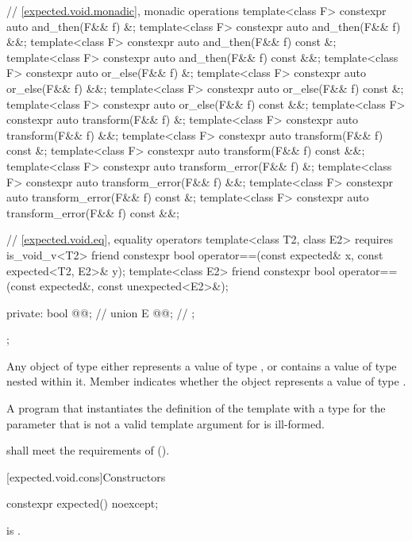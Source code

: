 \begin{codeblock}
{  // \ref{expected.void.monadic}, monadic operations
  template<class F> constexpr auto and_then(F&& f) &;
  template<class F> constexpr auto and_then(F&& f) &&;
  template<class F> constexpr auto and_then(F&& f) const &;
  template<class F> constexpr auto and_then(F&& f) const &&;
  template<class F> constexpr auto or_else(F&& f) &;
  template<class F> constexpr auto or_else(F&& f) &&;
  template<class F> constexpr auto or_else(F&& f) const &;
  template<class F> constexpr auto or_else(F&& f) const &&;
  template<class F> constexpr auto transform(F&& f) &;
  template<class F> constexpr auto transform(F&& f) &&;
  template<class F> constexpr auto transform(F&& f) const &;
  template<class F> constexpr auto transform(F&& f) const &&;
  template<class F> constexpr auto transform_error(F&& f) &;
  template<class F> constexpr auto transform_error(F&& f) &&;
  template<class F> constexpr auto transform_error(F&& f) const &;
  template<class F> constexpr auto transform_error(F&& f) const &&;

  // \ref{expected.void.eq}, equality operators
  template<class T2, class E2> requires is_void_v<T2>
    friend constexpr bool operator==(const expected& x, const expected<T2, E2>& y);
  template<class E2>
    friend constexpr bool operator==(const expected&, const unexpected<E2>&);

private:
  bool @@;         // \expos
  union {
    E @@;             // \expos
  };
};
\end{codeblock}

\pnum
Any object of type  either
represents a value of type , or
contains a value of type 
nested within it.
Member  indicates whether the  object
represents a value of type .

\pnum
A program that instantiates
the definition of the template  with
a type for the  parameter that
is not a valid template argument for  is ill-formed.

\pnum
{} shall meet the requirements of
 ().

[expected.void.cons]{Constructors}

%
\begin{itemdecl}
constexpr expected() noexcept;
\end{itemdecl}

\begin{itemdescr}
\pnum
\ensures
{} is .
\end{itemdescr}

